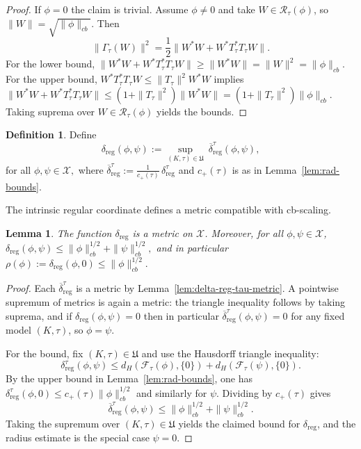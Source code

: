 \documentclass[11pt]{amsart}
\newtheorem{lemma}[theorem]{Lemma}
\theoremstyle{definition}
\newtheorem{definition}[theorem]{Definition}
\theoremstyle{remark}
\newcommand{\1}{\mathbbm{1}}
\begin{document}
\begin{proof}
If $\phi=0$ the claim is trivial. Assume $\phi\neq 0$ and take $W\in\mathscr R_\tau(\phi)$, so $\|W\|=\sqrt{\|\phi\|_{cb}}$.
Then
\[
\|\Gamma_\tau(W)\|^2=\frac12\|W^*W+W^*T^*_\tau T_\tau W\|.
\]
For the lower bound, $\|W^*W+W^*T^*_\tau T_\tau W\|\ge \|W^*W\|=\|W\|^2=\|\phi\|_{cb}$.
For the upper bound, $W^*T^*_\tau T_\tau W\le \|T_\tau \|^2 W^*W$ implies
$\|W^*W+W^*T^*_\tau T_\tau W\|\le (1+\|T_\tau \|^2)\|W^*W\|=(1+\|T_\tau \|^2)\|\phi\|_{cb}$.
Taking suprema over $W\in\mathscr R_\tau(\phi)$ yields the bounds.
\end{proof}

\begin{definition}
\label{def:delta-reg-max}
Define \[
\delta_{\mathrm{reg}}(\phi,\psi)
:=\sup_{(K,\tau)\in\mathfrak U}\ \overline{\delta}_{\mathrm{reg}}^{\tau}(\phi,\psi),
\]
 for all  $\phi,\psi\in\mathcal X,$ where $\overline{\delta}_{\mathrm{reg}}^{\tau}:=\frac{1}{c_+(\tau)}\,\delta_{\mathrm{reg}}^{\tau}$ and $c_+(\tau)$ is as in Lemma~\ref{lem:rad-bounds}.
\end{definition}
The intrinsic regular coordinate defines a metric compatible with cb-scaling.
\begin{lemma}
\label{lem:deltareg-basic}
The function $\delta_{\mathrm{reg}}$ is a metric on $\mathcal X$. Moreover, for all $\phi,\psi\in\mathcal X$, $\delta_{\mathrm{reg}}(\phi,\psi)\le \|\phi\|_{cb}^{1/2}+\|\psi\|_{cb}^{1/2},$ and in particular $\rho(\phi):=\delta_{\mathrm{reg}}(\phi,0)\le \|\phi\|_{cb}^{1/2}.$
\end{lemma}

\begin{proof}
Each $\overline{\delta}_{\mathrm{reg}}^{\tau}$ is a metric by Lemma~\ref{lem:delta-reg-tau-metric}.
A pointwise supremum of metrics is again a metric: the triangle inequality follows by taking suprema, and if $\delta_{\mathrm{reg}}(\phi,\psi)=0$ then in particular $\overline{\delta}_{\mathrm{reg}}^{\tau}(\phi,\psi)=0$ for any fixed model $(K,\tau)$, so $\phi=\psi$.

For the bound, fix $(K,\tau)\in\mathfrak U$ and use the Hausdorff triangle inequality:
\[
\delta_{\mathrm{reg}}^{\tau}(\phi,\psi)\le d_H(\mathscr F_\tau(\phi),\{0\})+d_H(\mathscr F_\tau(\psi),\{0\}).
\]
By the upper bound in Lemma~\ref{lem:rad-bounds}, one has
$ \delta_{\mathrm{reg}}^{\tau}(\phi,0)\le c_+(\tau)\|\phi\|_{cb}^{1/2}$ and similarly for $\psi$.
Dividing by $c_+(\tau)$ gives
\[
\overline{\delta}_{\mathrm{reg}}^{\tau}(\phi,\psi)\le \|\phi\|_{cb}^{1/2}+\|\psi\|_{cb}^{1/2}.
\]
Taking the supremum over $(K,\tau)\in\mathfrak U$ yields the claimed bound for $\delta_{\mathrm{reg}}$, and the radius estimate is the special case $\psi=0$.
\end{proof}
\end{document}
